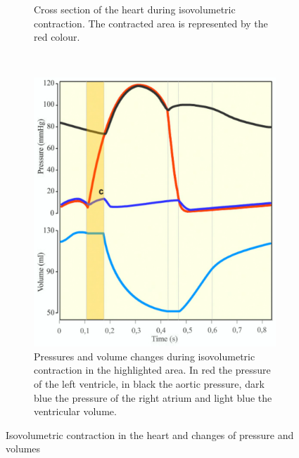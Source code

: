 \begin{figure}[!htpb]
	\begin{subfigure}[t]{0.48\textwidth}
		\centering
		\caption{Cross section of the heart during isovolumetric contraction. The contracted area is represented by the red colour.}
		\label{fig:heart isovolumic}
	\end{subfigure}
	~
	\begin{subfigure}[t]{0.48\textwidth}
		\centering
		\includegraphics[width=\textwidth,keepaspectratio]{figure_4}    
		\caption{Pressures and volume changes during isovolumetric contraction in the highlighted area. In red the pressure of the left ventricle, in black the aortic pressure, dark blue the pressure of the right atrium and light blue the ventricular volume.}
		\label{fig:pressure isovolumic}
	\end{subfigure}
	\caption{Isovolumetric contraction in the heart and changes of pressure and volumes}
\end{figure}

